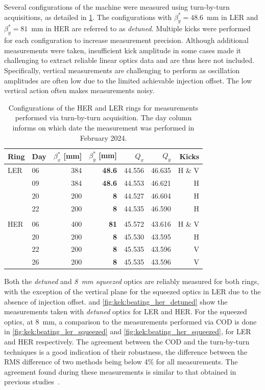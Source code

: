 Several configurations of the machine were measured using turn-by-turn acquisitions, as detailed in
\cref{tab:superkekb:configurations}. The configurations with $\beta_y^* = 48.6$~mm in LER and
$\beta_y^* = 81$~mm in HER are referred to as \textit{detuned}. Multiple kicks were performed for
each configuration to increase measurement precision. Although additional measurements were taken,
insufficient kick amplitude in some cases made it challenging to extract reliable linear optics data
and are thus here not included. Specifically, vertical measurements are challenging to perform as
oscillation amplitudes are often low due to the limited achievable injection offset. The low 
vertical action often makes measurements noisy.

\begin{table}
    \centering
    \begin{tabular}{llrrrrr}
    \hline
    Ring & Day & $\beta_x^*$ [mm] & $\beta_y^*$ [mm] & $Q_x$ & $Q_y$ & Kicks\\
    \hline
    LER        & 06 & 384 &\textbf{48.6} & 44.556 & 46.635 & H \& V \\
               & 09 & 384 &\textbf{48.6} & 44.553 & 46.621 & H  \\
               \hdashline
               & 20 & 200 & \textbf{8}   & 44.527 & 46.604 & H \\
               & 22 & 200 & \textbf{8}   & 44.535 & 46.590 & H \\
               &&&&&& \\
    HER        & 06 & 400 & \textbf{81}  & 45.572 & 43.616 & H \& V\\
               \hdashline
               & 20 & 200 & \textbf{8} & 45.530 & 43.595 & H \\
               & 22 & 200 & \textbf{8} & 45.535 & 43.596 & V \\
               & 26 & 200 & \textbf{8} & 45.535 & 43.596 & V \\
    \bottomrule
    \end{tabular}
  \caption{Configurations of the HER and LER rings for measurements performed via turn-by-turn
  acquisition. The day column informs on which date the measurement was performed in February 2024.}
  \label{tab:superkekb:configurations}
\end{table}

Both the \textit{detuned} and \textit{8~mm squeezed} optics are reliably measured for both rings, with
the exception of the vertical plane for the squeezed optics in LER due to the absence of injection
offset.
 and \cref{fig:kek:beating_her_detuned} show the measurements
taken with \textit{detuned} optics for LER and HER. For the squeezed optics, at 8~mm, a comparison
to the measurements performed via COD is done in \cref{fig:kek:beating_ler_squeezed} and
\cref{fig:kek:beating_her_squeezed}, for LER and HER respectively. The agreement between the COD
and the turn-by-turn techniques is a good indication of their robustness, the difference between the
RMS difference of two methods being below 4\% for all measurements. The agreement found during these
measurements is similar to that obtained in previous studies~\cite{keintzel_jacqueline_beam_2022}.


